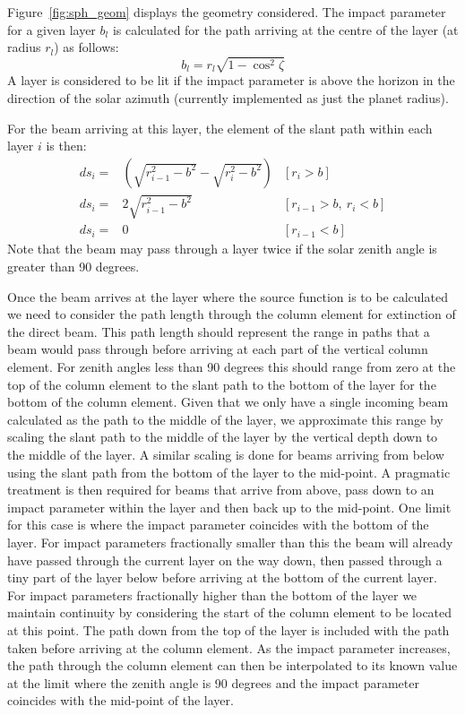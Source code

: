 \noindent
Figure~\ref{fig:sph_geom} displays the geometry considered. The impact
parameter for a given layer $b_l$ is calculated for the path arriving at the
centre of the layer (at radius $r_l$) as follows:
\begin{equation}
b_l = r_l \sqrt{1 - \cos^2{\zeta}}
\end{equation}
\noindent
A layer is considered to be lit if the impact parameter is above the horizon
in the direction of the solar azimuth (currently implemented as just the planet
radius).

\noindent
For the beam arriving at this layer, the element of the slant path within
each layer $i$ is then:
\begin{eqnarray}
ds_i = & \left( \sqrt{r_{i-1}^2 - b^2} - \sqrt{r_{i}^2 - b^2} \right) & [r_i > b] \nonumber \\
ds_i = & 2\sqrt{r_{i-1}^2 - b^2} & [r_{i-1} > b, ~r_i < b] \\
ds_i = & 0 & [r_{i-1} < b] \nonumber
\end{eqnarray}
\noindent
Note that the beam may pass through a layer twice if the solar zenith angle is
greater than 90 degrees.

\noindent
Once the beam arrives at the layer where the source function is to be
calculated we need to consider the path length through the column element
for extinction of the direct beam. This path length should represent the
range in paths that
a beam would pass through before arriving at each part of the vertical column
element. For zenith angles less than 90 degrees this should range from zero at
the top of the column element to the slant path to the bottom of the layer for
the bottom of the column element. Given that we only have a single incoming
beam calculated as the path to the middle of the layer, we approximate this
range by scaling the slant path to the middle of the layer by the vertical
depth down to the middle of the layer. A similar scaling is done for beams
arriving from below using the slant path from the bottom of the layer to the
mid-point. A pragmatic treatment is then required for beams that arrive from
above, pass down to an impact parameter within the layer and then back up to
the mid-point. One limit for this case is where the impact parameter coincides
with the bottom of the layer. For impact parameters fractionally smaller than
this the beam will already have passed through the current layer on the
way down, then passed through a tiny part of the layer below before arriving
at the bottom of the current layer. For impact parameters fractionally higher
than the bottom of the layer we maintain continuity by considering the start
of the column element to be located at this point. The path down from the top
of the layer is included with the path taken before arriving at the column
element. As the impact parameter increases, the path through the column element
can then be interpolated to its known value at the limit where the zenith
angle is 90 degrees and the impact parameter coincides with the mid-point of
the layer.


